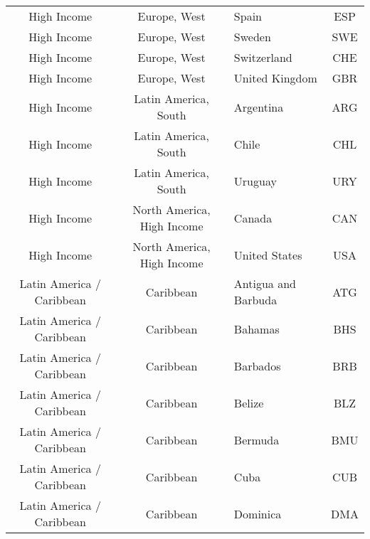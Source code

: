 \begin{landscape}
\begin{longtable}{|c|c|p{5cm}|c|}
                   High Income &                 Europe, West &                                             Spain &  ESP \\
                   High Income &                 Europe, West &                                            Sweden &  SWE \\
                   High Income &                 Europe, West &                                       Switzerland &  CHE \\
                   High Income &                 Europe, West &                                    United Kingdom &  GBR \\
                   High Income &         Latin America, South &                                         Argentina &  ARG \\
                   High Income &         Latin America, South &                                             Chile &  CHL \\
                   High Income &         Latin America, South &                                           Uruguay &  URY \\
                   High Income &   North America, High Income &                                            Canada &  CAN \\
                   High Income &   North America, High Income &                                     United States &  USA \\
     Latin America / Caribbean &                    Caribbean &                               Antigua and Barbuda &  ATG \\
     Latin America / Caribbean &                    Caribbean &                                           Bahamas &  BHS \\
     Latin America / Caribbean &                    Caribbean &                                          Barbados &  BRB \\
     Latin America / Caribbean &                    Caribbean &                                            Belize &  BLZ \\
     Latin America / Caribbean &                    Caribbean &                                           Bermuda &  BMU \\
     Latin America / Caribbean &                    Caribbean &                                              Cuba &  CUB \\
     Latin America / Caribbean &                    Caribbean &                                          Dominica &  DMA \\

\end{longtable}
\end{landscape}
